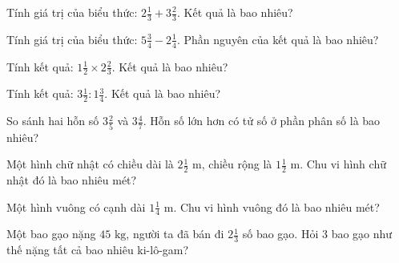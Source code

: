 \begin{ex}
  Tính giá trị của biểu thức: $2\frac{1}{3} + 3\frac{2}{3}$. Kết quả là bao nhiêu?
\end{ex}

\begin{ex}
  Tính giá trị của biểu thức: $5\frac{3}{4} - 2\frac{1}{4}$. Phần nguyên của kết quả là bao nhiêu?
\end{ex}

\begin{ex}
  Tính kết quả: $1\frac{1}{2} \times 2\frac{2}{3}$. Kết quả là bao nhiêu?
\end{ex}

\begin{ex}
  Tính kết quả: $3\frac{1}{2} : 1\frac{3}{4}$. Kết quả là bao nhiêu?
\end{ex}

\begin{ex}
  So sánh hai hỗn số $3\frac{2}{5}$ và $3\frac{4}{7}$. Hỗn số lớn hơn có tử số ở phần phân số là bao nhiêu?
\end{ex}

\begin{ex}
  Một hình chữ nhật có chiều dài là $2\frac{1}{2}\text{ m}$, chiều rộng là $1\frac{1}{2}\text{ m}$. Chu vi hình chữ nhật đó là bao nhiêu mét?
\end{ex}

\begin{ex}
  Một hình vuông có cạnh dài $1\frac{1}{4}\text{ m}$. Chu vi hình vuông đó là bao nhiêu mét?
\end{ex}

\begin{ex}
  Một bao gạo nặng $45\text{ kg}$, người ta đã bán đi $2\frac{1}{3}$ số bao gạo. Hỏi 3 bao gạo như thế nặng tất cả bao nhiêu ki-lô-gam?
\end{ex}

